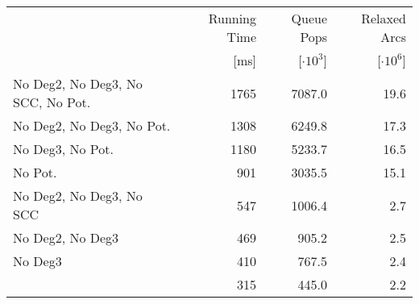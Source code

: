 \begin{tabular}{lrrr}
\toprule
{} & Running Time &     Queue Pops &   Relaxed Arcs \\
{} &         [ms] & [$\cdot 10^3$] & [$\cdot 10^6$] \\
\midrule
No Deg2, No Deg3, No SCC, No Pot. & 1765 & 7087.0 & 19.6 \\
No Deg2, No Deg3, No Pot.         & 1308 & 6249.8 & 17.3 \\
No Deg3, No Pot.                  & 1180 & 5233.7 & 16.5 \\
No Pot.                           &  901 & 3035.5 & 15.1 \\
No Deg2, No Deg3, No SCC          &  547 & 1006.4 &  2.7 \\
No Deg2, No Deg3                  &  469 &  905.2 &  2.5 \\
No Deg3                           &  410 &  767.5 &  2.4 \\
                                  &  315 &  445.0 &  2.2 \\
\bottomrule
\end{tabular}

